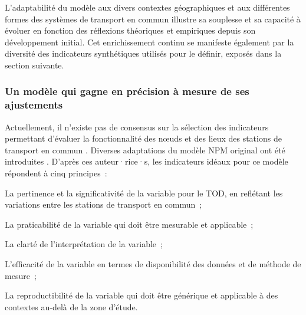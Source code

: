 \begin{refsegment}
L'adaptabilité du modèle aux divers contextes géographiques et aux différentes formes des systèmes de transport en commun illustre sa souplesse et sa capacité à évoluer en fonction des réflexions théoriques et empiriques depuis son développement initial. Cet enrichissement continu se manifeste également par la diversité des indicateurs synthétiques utilisés pour le définir, exposés dans la section suivante.%

\subsubsection*{Un modèle qui gagne en précision à mesure de ses ajustements
    \label{chap6:litterature-indicateurs}
    }

Actuellement, il n'existe pas de consensus sur la sélection des indicateurs permettant d'évaluer la fonctionnalité des nœuds et des lieux des stations de transport en commun \textcolor{blue}{\autocites[446]{chen_node-place_2015}[194]{reusser_classifying_2008}}. Diverses adaptations du modèle \acrshort{NPM} original ont été introduites \textcolor{blue}{\autocites[2]{lee_passive_2024}[20]{lukman_development_2014}}. D'après ces auteur·rice·s, les indicateurs idéaux pour ce modèle répondent à cinq principes~:
\begin{customitemize}
    \item La pertinence et la significativité de la variable pour le \acrshort{TOD}, en reflétant les variations entre les stations de transport en commun~;
    \item La praticabilité de la variable qui doit être mesurable et applicable~;
    \item La clarté de l'interprétation de la variable~;
    \item L'efficacité de la variable en termes de disponibilité des données et de méthode de mesure~;
    \item La reproductibilité de la variable qui doit être générique et applicable à des contextes au-delà de la zone d'étude.
\end{customitemize}%


\end{refsegment}
